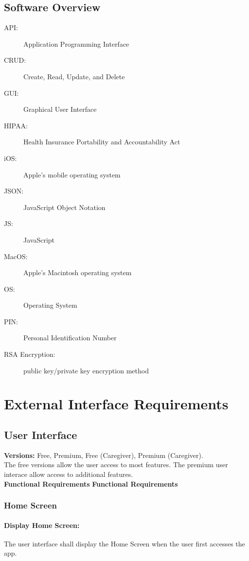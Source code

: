 \documentclass{article}
\begin{document}
\subsection{Software Overview}
\begin{description}
\item[API:] Application Programming Interface
\item[CRUD:] Create, Read, Update, and Delete
\item[GUI:] Graphical User Interface
\item[HIPAA:] Health Insurance Portability and Accountability Act
\item[iOS:] Apple’s mobile operating system
\item[JSON:] JavaScript Object Notation
\item[JS:] JavaScript
\item[MacOS:] Apple’s Macintosh operating system
\item[OS:] Operating System
\item[PIN:] Personal Identification Number
\item[RSA Encryption:] public key/private key encryption method
\end{description}




\section{External Interface Requirements}
\subsection{User Interface}
\textbf{Versions:} Free, Premium, Free (Caregiver), Premium (Caregiver). \\
The free versions allow the user access to most features. The premium user interace allow access to additional features. \\
\textbf{Functional Requirements}
\textbf{Functional Requirements}
\setcounter{subsubsection}{0}
\subsubsection*{Home Screen}
\addtocounter{subsubsection}{1}
\paragraph{Display Home Screen:} The user interface shall display the Home Screen when the user first accesses the app.
\end{document}
